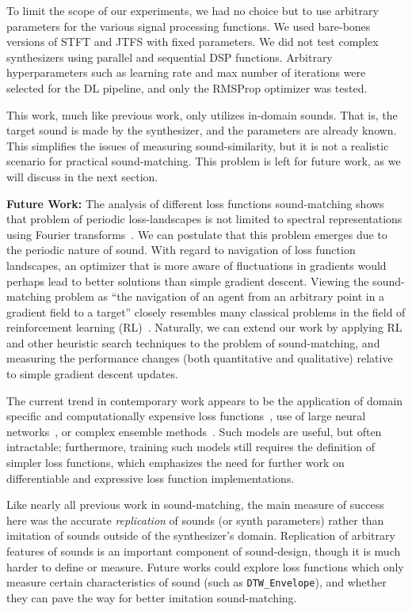\documentclass[lettersize,journal]{IEEEtran}
\newcommand{\DTWEnv}{\texttt{DTW\_Envelope}}
\begin{document}
To limit the scope of our experiments, we had no choice but to use arbitrary parameters for the various signal processing functions. We used bare-bones versions of STFT and JTFS with fixed parameters. We did not test complex synthesizers using parallel and sequential DSP functions. Arbitrary hyperparameters such as learning rate and max number of iterations were selected for the DL pipeline, and only the RMSProp optimizer was tested. 

 This work, much like previous work, only utilizes in-domain sounds. That is, the target sound is made by the synthesizer, and the parameters are already known. This simplifies the issues of measuring sound-similarity, but it is not a realistic scenario for practical sound-matching. This problem is left for future work, as we will discuss in the next section.

\label{sec:future}
\textbf{Future Work: }The analysis of different loss functions sound-matching shows that problem of periodic loss-landscapes is not limited to spectral representations using Fourier transforms~\cite{turian2020sorry,vahidi2023mesostructures,uzrad2024diffmoog,bruford2024synthesizer}. We can postulate that this problem emerges due to the periodic nature of sound. With regard to navigation of loss function landscapes, an optimizer that is more aware of fluctuations in gradients would perhaps lead to better solutions than simple gradient descent. Viewing the sound-matching problem as ``the navigation of an agent from an arbitrary point in a gradient field to a target'' closely resembles many classical problems in the field of reinforcement learning (RL)~\cite{sutton2018reinforcement}. Naturally, we can extend our work by applying RL and other heuristic search techniques to the problem of sound-matching, and measuring the performance changes (both quantitative and qualitative) relative to simple gradient descent updates. 

The current trend in contemporary work appears to be the application of domain specific and computationally expensive loss functions~\cite{han2023perceptual,uzrad2024diffmoog}, use of large neural networks~\cite{hershey2017cnn,cramer2019look}, or complex ensemble methods~\cite{turian2022hear}. Such models are useful, but often intractable; furthermore, training such models still requires the definition of simpler loss functions, which emphasizes the need for further work on differentiable and expressive loss function implementations. 

Like nearly all previous work in sound-matching, the main measure of success here was the accurate \textit{replication} of sounds (or synth parameters) rather than imitation of sounds outside of the synthesizer's domain. Replication of arbitrary features of sounds is an important component of sound-design, though it is much harder to define or measure. Future works could explore loss functions which only measure certain characteristics of sound (such as \DTWEnv), and whether they can pave the way for better imitation sound-matching.



\end{document}
